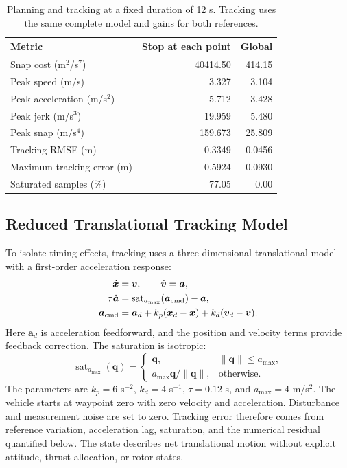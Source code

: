 \documentclass[letterpaper,10pt,conference]{ieeeconf}
\newcommand{\norm}[1]{\lVert#1\rVert}
\begin{document}
\begin{table}[t]\centering\small
\caption{Planning and tracking at a fixed duration of 12 s. Tracking uses the same complete model and gains for both references.}
\label{tab:planning}
\begin{tabular}{lrr}\toprule
Metric&Stop at each point&Global\\\midrule
Snap cost (m$^2$/s$^7$)&40414.50&414.15\\
Peak speed (m/s)&3.327&3.104\\
Peak acceleration (m/s$^2$)&5.712&3.428\\
Peak jerk (m/s$^3$)&19.959&5.480\\
Peak snap (m/s$^4$)&159.673&25.809\\\midrule
Tracking RMSE (m)&0.3349&0.0456\\
Maximum tracking error (m)&0.5924&0.0930\\
Saturated samples (\%)&77.05&0.00\\\bottomrule
\end{tabular}
\end{table}
\subsection{Reduced Translational Tracking Model}
To isolate timing effects, tracking uses a three-dimensional translational model with a first-order acceleration response:
\begin{align}
\dot{\bm x}&=\bm v,\qquad \dot{\bm v}=\bm a,\\
\tau\dot{\bm a}&=\operatorname{sat}_{a_{\max}}(\bm a_{\rm cmd})-\bm a,\\
\bm a_{\rm cmd}&=\bm a_d+k_p(\bm x_d-\bm x)+k_d(\bm v_d-\bm v).
\label{eq:controller}
\end{align}
Here $\bm a_d$ is acceleration feedforward, and the position and velocity terms provide feedback correction.
The saturation is isotropic:
\begin{equation}
\operatorname{sat}_{a_{\max}}(\bm q)=
\begin{cases}\bm q,&\norm{\bm q}\leq a_{\max},\\
a_{\max}\bm q/\norm{\bm q},&\text{otherwise}.
\end{cases}
\end{equation}
The parameters are $k_p=6$ s$^{-2}$, $k_d=4$ s$^{-1}$, $\tau=0.12$ s, and $a_{\max}=4$ m/s$^2$.
The vehicle starts at waypoint zero with zero velocity and acceleration.
Disturbance and measurement noise are set to zero.
Tracking error therefore comes from reference variation, acceleration lag, saturation, and the numerical residual quantified below.
The state describes net translational motion without explicit attitude, thrust-allocation, or rotor states.
\end{document}
